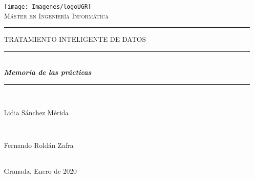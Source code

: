 \begin{titlepage}

\newcommand{\HRule}{\rule{\linewidth}{0.5mm}} %

\center %


\begin{minipage}{14cm}
\center

\texttt{[image: Imagenes/logoUGR]}\\[3cm] %


\textsc{\LARGE Máster en Ingeniería Informática}\\[2.0cm] 



\rule[1.7mm]{1.1cm}{0.5mm}
\hfill
\textsc{\Large TRATAMIENTO INTELIGENTE DE DATOS} 
\hfill
\rule[1.7mm]{1.1cm}{0.5mm} 
\\[0.75cm]

{\Huge
\textbf{\textit{
Memoria de las prácticas \\[0.5cm]}}}

\HRule \\[2cm]

{\Large

Lidia Sánchez Mérida} \\[1.0cm]

{\Large

Fernando Roldán Zafra} \\[2.0cm]

{\large
Granada, Enero de 2020
}

\end{minipage}

\vfill %

\cleardoublepage
\thispagestyle{empty}
\end{titlepage}

\raggedbottom

